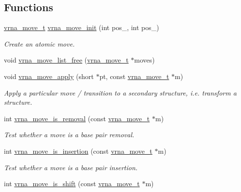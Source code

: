 \subsection*{Functions}
\begin{DoxyCompactItemize}
\item 
\mbox{\hyperlink{group__neighbors_ga08630e00206cd163ea29c462bf5f4755}{vrna\+\_\+move\+\_\+t}} \mbox{\hyperlink{group__neighbors_gaeff6157398a2073f587416fa9ec94789}{vrna\+\_\+move\+\_\+init}} (int pos\+\_, int pos\+\_)
\begin{DoxyCompactList}\small\item\em Create an atomic move. \end{DoxyCompactList}\item 
void \mbox{\hyperlink{group__neighbors_gad085062ae3aa7ee20783debe4a906fad}{vrna\+\_\+move\+\_\+list\+\_\+free}} (\mbox{\hyperlink{group__neighbors_ga08630e00206cd163ea29c462bf5f4755}{vrna\+\_\+move\+\_\+t}} $\ast$moves)
\item 
void \mbox{\hyperlink{group__neighbors_gacdbc5f609b46aeb07d2c7e015677a1e0}{vrna\+\_\+move\+\_\+apply}} (short $\ast$pt, const \mbox{\hyperlink{group__neighbors_ga08630e00206cd163ea29c462bf5f4755}{vrna\+\_\+move\+\_\+t}} $\ast$m)
\begin{DoxyCompactList}\small\item\em Apply a particular move / transition to a secondary structure, i.\+e. transform a structure. \end{DoxyCompactList}\item 
int \mbox{\hyperlink{group__neighbors_ga9cf75e9c6551f46ea568abf4f7fd11cd}{vrna\+\_\+move\+\_\+is\+\_\+removal}} (const \mbox{\hyperlink{group__neighbors_ga08630e00206cd163ea29c462bf5f4755}{vrna\+\_\+move\+\_\+t}} $\ast$m)
\begin{DoxyCompactList}\small\item\em Test whether a move is a base pair removal. \end{DoxyCompactList}\item 
int \mbox{\hyperlink{group__neighbors_ga613d33e6fa8e784d76b34bb07458f398}{vrna\+\_\+move\+\_\+is\+\_\+insertion}} (const \mbox{\hyperlink{group__neighbors_ga08630e00206cd163ea29c462bf5f4755}{vrna\+\_\+move\+\_\+t}} $\ast$m)
\begin{DoxyCompactList}\small\item\em Test whether a move is a base pair insertion. \end{DoxyCompactList}\item 
int \mbox{\hyperlink{group__neighbors_ga31a8c4c2db9f54cb8f2d2cdf3b725d4d}{vrna\+\_\+move\+\_\+is\+\_\+shift}} (const \mbox{\hyperlink{group__neighbors_ga08630e00206cd163ea29c462bf5f4755}{vrna\+\_\+move\+\_\+t}} $\ast$m)

\end{DoxyCompactItemize}
